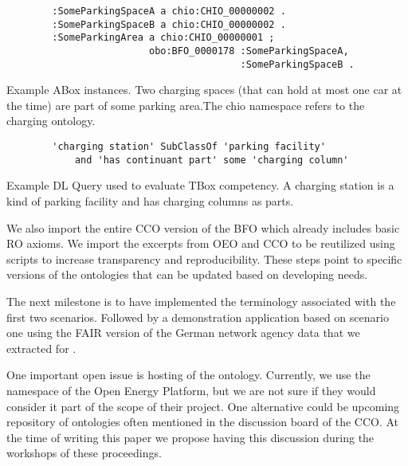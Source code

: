 \begin{listing}[h]
    \begin{verbatim}
        :SomeParkingSpaceA a chio:CHIO_00000002 .
        :SomeParkingSpaceB a chio:CHIO_00000002 .
        :SomeParkingArea a chio:CHIO_00000001 ;
                         obo:BFO_0000178 :SomeParkingSpaceA,
                                         :SomeParkingSpaceB .
    \end{verbatim}
    \caption{Example ABox instances. Two charging spaces (that can hold at most one car at the time) are part of some parking area.The chio namespace refers to the charging ontology.}
    \label{lst:2}
\end{listing}

\begin{listing}[h]
    \begin{verbatim}
        'charging station' SubClassOf 'parking facility' 
            and 'has continuant part' some 'charging column'
    \end{verbatim}
    \caption{Example DL Query used to evaluate TBox competency. A charging station is a kind of parking facility and has charging columns as parts.}
    \label{lst:3}
\end{listing}

We also import the entire CCO version of the BFO which already
includes basic RO axioms. We import  the excerpts from OEO and CCO to be
reutilized using scripts to increase transparency and reproducibility. These
steps point to specific versions of the ontologies that can be updated based on
developing needs. 

The next milestone is to have implemented the terminology associated with the
first two scenarios. Followed by a demonstration application based on scenario
one using the FAIR version of the German network agency data that we extracted
for \cite{ArellanoRuiz.2024}.

One important open issue is hosting of the ontology. Currently, we use the
namespace of the Open Energy Platform, but we are not sure if they would
consider it part of the scope of their project. One alternative could be
upcoming repository of ontologies often mentioned in the discussion board of
the CCO. At the time of writing this paper we propose having this discussion
during the workshops of these proceedings.




    